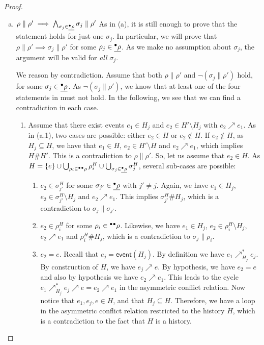 \documentclass{article}
\newcommand{\event}[1]{\ensuremath{\mathsf{event}(#1)}}
\newcommand{\confl}{\ensuremath{\mathord{\#}}}
\begin{document}
\begin{proof}
\begin{enumerate}[(a)]
\item $\rho \parallel \rho' \implies \bigwedge_{\sigma_j \in \underline{{}^\bullet\rho}}
\sigma_j \parallel \rho'$  As in (a), it is still enough to prove that the
statement holds for just one $\sigma_j$.  In particular, we will prove that
$\rho \parallel \rho' \implies \sigma_j \parallel \rho'$ for some $\rho_j \in
\underline{{}^\bullet\rho}$.  As we make no assumption about $\sigma_j$, the argument will be
valid for \emph{all} $\sigma_j$.

We reason by contradiction.  Assume that both $\rho \parallel \rho'$ and $\lnot
(\sigma_j \parallel \rho')$ hold, for some $\sigma_j \in \underline{{}^\bullet\rho}$.  As
$\lnot (\sigma_j \parallel \rho')$, we know that at least one of the four
statements in  must not hold.  In the following, we see
that we can find a contradiction in each case.

\begin{enumerate}[1.]
\item Assume that there exist events $e_1 \in H_j$ and $e_2 \in H' \setminus
H_j$ with $e_2 \nearrow e_1$.  As in (a.1), two cases are possible: either $e_2
\in H$ or $e_2 \notin H$.  If $e_2 \notin H$, as $H_j \subseteq H$, we have
that $e_1 \in H$, $e_2 \in H' \setminus H$ and $e_2 \nearrow e_1$, which
implies $H \confl H'$.  This is a contradiction to $\rho \parallel \rho'$.  So,
let us assume that $e_2 \in H$.  As $H = \{e\} \cup \bigcup_{\rho_i \in
{}^\bullet{}^\bullet\rho} \rho^H_i \cup \bigcup_{\sigma_j \in \underline{{}^\bullet\rho}}
\sigma^H_j$, several sub-cases are possible:

\begin{enumerate}
\item $e_2 \in \sigma^H_{j'}$ for some $\sigma_{j'} \in \underline{{}^\bullet\rho}$ with
$j' \not= j$.  Again, we have $e_1 \in H_j$, $e_2 \in \sigma^H_{j'} \setminus
H_j$ and $e_2 \nearrow e_1$.  This implies $\sigma^H_{j'} \confl H_j$, which is
a contradiction to $\sigma_j \parallel \sigma_{j'}$.

\item $e_2 \in \rho^H_i$ for some $\rho_i \in {}^\bullet{}^\bullet\rho$.  Likewise, we
have $e_1 \in H_j$, $e_2 \in \rho^H_i \setminus H_j$, $e_2 \nearrow e_1$ and
$\rho^H_i \confl H_j$, which is a contradiction to $\sigma_j \parallel \rho_i$.

\item $e_2 = e$.  Recall that $e_j = \event{H_j}$.  By definition
 we have $e_1 \nearrow^*_{H_j} e_j$.  By construction of $H$, we
have $e_j \nearrow e$.  By hypothesis, we have $e_2 = e$ and also by hypothesis
we have $e_2 \nearrow e_1$.  This leads to the cycle $e_1 \nearrow^*_{H_j} e_j
\nearrow e = e_2 \nearrow e_1$ in the asymmetric conflict relation.  Now notice
that $e_1, e_j, e \in H$, and that $H_j \subseteq H$.  Therefore, we have a
loop in the asymmetric conflict relation restricted to the history $H$, which
is a contradiction to the fact that $H$ is a history.
\end{enumerate}


\end{enumerate}
\end{enumerate}
\end{proof}
\end{document}
